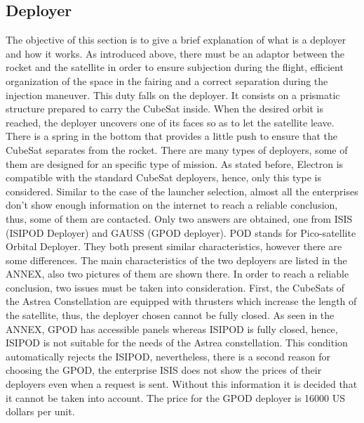 \subsection{Deployer}
The objective of this section is to give a brief explanation of what is a deployer and how it works. 
As introduced above, there must be an adaptor between the rocket and the satellite in order to ensure subjection during the flight, efficient organization of the space in the fairing and a correct separation during the injection maneuver. This duty falls on the deployer. It consists on a prismatic structure prepared to carry the CubeSat inside. When the desired orbit is reached, the deployer uncovers one of its faces so as to let the satellite leave. There is a spring in the bottom that provides a little push to ensure that the CubeSat separates from the rocket. 
There are many types of deployers, some of them are designed for an specific type of mission. As stated before, Electron is compatible with the standard CubeSat deployers, hence, only this type is considered. Similar to the case of the launcher selection, almost all the enterprises don't show enough information on the internet to reach a reliable conclusion, thus, some of them are contacted. Only two answers are obtained, one from ISIS (ISIPOD Deployer) and GAUSS (GPOD deployer). POD stands for Pico-satellite Orbital Deployer. 
\newline\newline
They both present similar characteristics, however there are some differences. The main characteristics of the two deployers are listed in the ANNEX, also two pictures of them are shown there.
In order to reach a reliable conclusion, two issues must be taken into consideration. First, the CubeSats of the Astrea Constellation are equipped with thrusters which increase the length of the satellite, thus, the deployer chosen cannot be fully closed. As seen in the ANNEX, GPOD has accessible panels whereas ISIPOD is fully closed, hence, ISIPOD is not suitable for the needs of the Astrea constellation. This condition automatically rejects the ISIPOD, nevertheless, there is a second reason for choosing the GPOD, the enterprise ISIS does not show the prices of their deployers even when a request is sent. Without this information it is decided that it cannot be taken into account. The price for the GPOD  deployer is 16000 US dollars per unit. 

